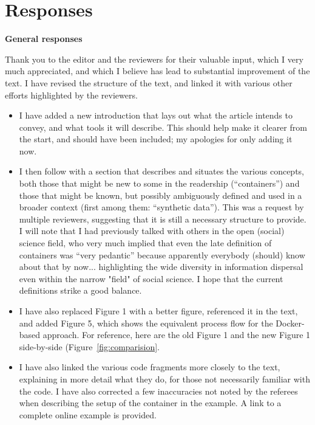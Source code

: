 \newpage
\section*{Responses}


\textbf{General responses}

\begin{response}
    Thank you to the editor and the reviewers for their valuable input, which I very much appreciated, and which I believe has lead to substantial improvement of the text. I have revised the structure of the text, and linked it with various other efforts highlighted by the reviewers. 

    \begin{itemize}
        \item I have added a new introduction that lays out what the article intends to convey, and what tools it will describe. This should help make it clearer from the start, and should have been included; my apologies for only adding it now.
        \item I then follow with a section that describes and situates the various concepts, both those that might be new to some in the readership (``containers'') and those that might be known, but possibly ambiguously defined and used in a broader context (first among them: ``synthetic data''). This was a request by multiple reviewers, suggesting that it is still a necessary structure to provide. I will note that I had previously talked with others in the open (social) science field, who very much implied that even the late definition of containers was ``very pedantic'' because apparently everybody (should) know about that by now... highlighting the wide diversity in information dispersal even within the narrow "field" of social science. I hope that the current definitions strike a good balance.
        \item I have also replaced Figure 1 with a better figure, referenced it in the text, and added Figure 5, which shows the equivalent process flow for the Docker-based approach. For reference, here are the old Figure 1 and the new Figure 1 side-by-side (Figure~\ref{fig:comparision}.
        \item     I have also linked the various code fragments more closely to the text, explaining in more detail what they do, for those not necessarily familiar with the code. I have also corrected a few inaccuracies not noted by the referees when describing the setup of the container in the example. A link to a complete online example is provided.
    \end{itemize}
\end{response}

